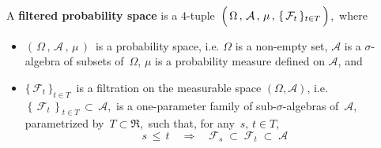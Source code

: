 \vskip 1.0cm
\begin{definition}
\mbox{}
\vskip 0.1cm
\noindent
A \textbf{filtered probability space} is a $4$-tuple
\,$\left(\,\overset{{\color{white}.}}{\Omega} \,,\, \mathcal{A} \,,\, \mu \,,\, \{\,\mathcal{F}_{t}\,\}_{t \in T} \,\right)$,\,
where
\begin{itemize}
\item
	$\left(\,\Omega \,,\, \mathcal{A} \,,\, \mu \,\right)$\, is a probability space, i.e.
	$\Omega$ is a non-empty set, $\mathcal{A}$ is a $\sigma$-algebra of subsets of \,$\Omega$,
	$\mu$ is a probability measure defined on $\mathcal{A}$, and
\item
	$\{\,\mathcal{F}_{t}\,\}_{t \in T}$\, is a filtration on the measurable space $(\Omega,\mathcal{A})$, i.e.
	\,$\left\{\,\mathcal{F}_{t}\,\right\}_{t \in T} \,\subset\, \mathcal{A}$,\,
	is a one-parameter family of sub-$\sigma$-algebras of \,$\mathcal{A}$,\,
	parametrized by \,$T \subset \Re$,\,
	such that, for any \,$s,\, t \in T$,
	\begin{equation*}
	s \,\leq\, t
	\quad\Longrightarrow\quad
	\mathcal{F}_{s} \; \subset \; \mathcal{F}_{t} \; \subset \; \mathcal{A}
	\end{equation*}
\end{itemize}
\end{definition}


